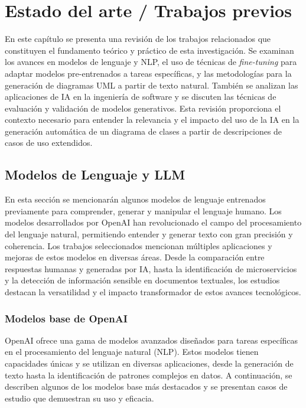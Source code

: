 \label{chapter:estado-arte}\chapter[Estado del arte]{Estado del arte / Trabajos previos}

En este capítulo se presenta una revisión de los trabajos relacionados que constituyen el fundamento teórico y práctico de esta investigación. Se examinan los avances en modelos de lenguaje y NLP, el uso de técnicas de \textit{fine-tuning} para adaptar modelos pre-entrenados a tareas específicas, y las metodologías para la generación de diagramas UML a partir de texto natural. También se analizan las aplicaciones de IA en la ingeniería de software y se discuten las técnicas de evaluación y validación de modelos generativos. Esta revisión proporciona el contexto necesario para entender la relevancia y el impacto del uso de la IA en la generación automática de un diagrama de clases a partir de descripciones de casos de uso extendidos.

\section{Modelos de Lenguaje y LLM}

En esta sección se mencionarán algunos modelos de lenguaje entrenados previamente para comprender, generar y manipular el lenguaje humano. Los modelos desarrollados por OpenAI han revolucionado el campo del procesamiento del lenguaje natural, permitiendo entender y generar texto con gran precisión y coherencia. Los trabajos seleccionados mencionan múltiples aplicaciones y mejoras de estos modelos en diversas áreas. Desde la comparación entre respuestas humanas y generadas por IA, hasta la identificación de microservicios y la detección de información sensible en documentos textuales, los estudios destacan la versatilidad y el impacto transformador de estos avances tecnológicos.

\subsection{Modelos base de OpenAI}

OpenAI ofrece una gama de modelos avanzados diseñados para tareas específicas en el procesamiento del lenguaje natural (NLP). Estos modelos tienen capacidades únicas y se utilizan en diversas aplicaciones, desde la generación de texto hasta la identificación de patrones complejos en datos. A continuación, se describen algunos de los modelos base más destacados y se presentan casos de estudio que demuestran su uso y eficacia. 

